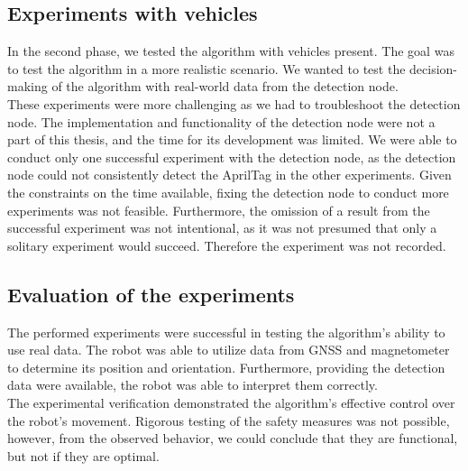     \subsection{Experiments with vehicles}
        In the second phase, we tested the algorithm with vehicles present. The goal was to test the algorithm in a more realistic scenario. We wanted to test the decision-making of the algorithm with real-world data from the detection node.\\
        These experiments were more challenging as we had to troubleshoot the detection node. The implementation and functionality of the detection node were not a part of this thesis, and the time for its development was limited. We were able to conduct only one successful experiment with the detection node, as the detection node could not consistently detect the AprilTag in the other experiments. Given the constraints on the time available, fixing the detection node to conduct more experiments was not feasible. Furthermore, the omission of a result from the successful experiment was not intentional, as it was not presumed that only a solitary experiment would succeed. Therefore the experiment was not recorded.

    \subsection{Evaluation of the experiments}
        The performed experiments were successful in testing the algorithm's ability to use real data. The robot was able to utilize data from GNSS and magnetometer to determine its position and orientation. Furthermore, providing the detection data were available, the robot was able to interpret them correctly.\\
        The experimental verification demonstrated the algorithm's effective control over the robot's movement. Rigorous testing of the safety measures was not possible, however, from the observed behavior, we could conclude that they are functional, but not if they are optimal.
